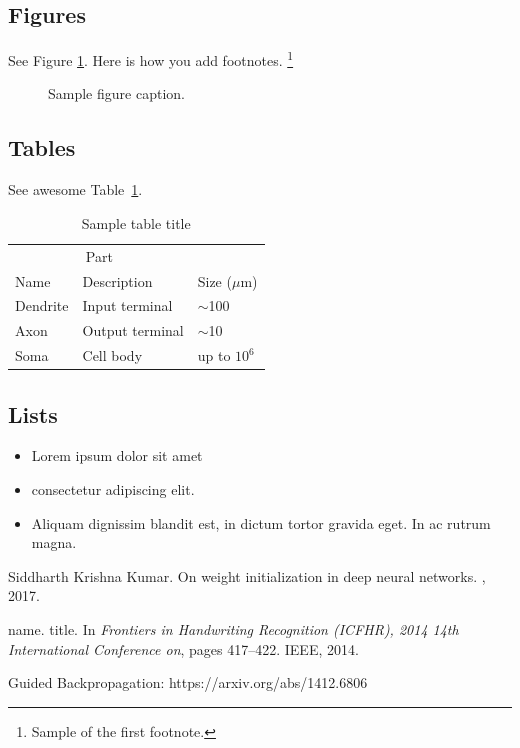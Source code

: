 \documentclass{article}
\begin{document}
\subsection{Figures}
\lipsum[10] 
See Figure \ref{fig:fig1}. Here is how you add footnotes. \footnote{Sample of the first footnote.}
\lipsum[11] 

\begin{figure}
  \centering
  \fbox{\rule[-.5cm]{4cm}{4cm} \rule[-.5cm]{4cm}{0cm}}
  \caption{Sample figure caption.}
  \label{fig:fig1}
\end{figure}

\subsection{Tables}
\lipsum[12]
See awesome Table~\ref{tab:table}.

\begin{table}
 \caption{Sample table title}
  \centering
  \begin{tabular}{lll}
    \toprule
    \multicolumn{2}{c}{Part}                   \\
    \cmidrule(r){1-2}
    Name     & Description     & Size ($\mu$m) \\
    \midrule
    Dendrite & Input terminal  & $\sim$100     \\
    Axon     & Output terminal & $\sim$10      \\
    Soma     & Cell body       & up to $10^6$  \\
    \bottomrule
  \end{tabular}
  \label{tab:table}
\end{table}

\subsection{Lists}
\begin{itemize}
\item Lorem ipsum dolor sit amet
\item consectetur adipiscing elit. 
\item Aliquam dignissim blandit est, in dictum tortor gravida eget. In ac rutrum magna.
\end{itemize}


  


\begin{thebibliography}{1}

Siddharth Krishna Kumar.
\newblock On weight initialization in deep neural networks.
, 2017.

name.
\newblock title.
\newblock In {\em Frontiers in Handwriting Recognition (ICFHR), 2014 14th
  International Conference on}, pages 417--422. IEEE, 2014.

Guided Backpropagation: https://arxiv.org/abs/1412.6806

\end{thebibliography}
\end{document}
